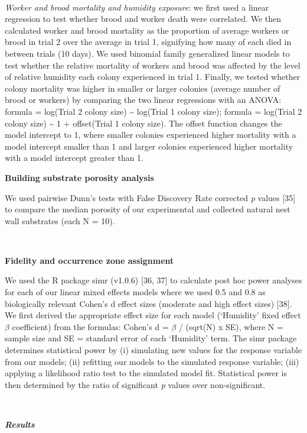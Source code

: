 \documentclass[3p]{elsarticle} %
\begin{document}
~

\emph{Worker and brood mortality and humidity exposure}: we first used a
linear regression to test whether brood and worker death were
correlated. We then calculated worker and brood mortality as the
proportion of average workers or brood in trial 2 over the average in
trial 1, signifying how many of each died in between trials (10 days).
We used binomial family generalized linear models to test whether the
relative mortality of workers and brood was affected by the level of
relative humidity each colony experienced in trial 1. Finally, we tested
whether colony mortality was higher in smaller or larger colonies
(average number of brood or workers) by comparing the two linear
regressions with an ANOVA: formula = log(Trial 2 colony size)
\textasciitilde{} log(Trial 1 colony size); formula = log(Trial 2 colony
size) \textasciitilde{} 1 + offset(Trial 1 colony size). The offset
function changes the model intercept to 1, where smaller colonies
experienced higher mortality with a model intercept smaller than 1 and
larger colonies experienced higher mortality with a model intercept
greater than 1.

\textbf{Building substrate porosity analysis}

We used pairwise Dunn's tests with False Discovery Rate corrected
\emph{p} values {[}35{]} to compare the median porosity of our
experimental and collected natural nest wall substrates (each N = 10).

~

\textbf{Fidelity and occurrence zone assignment}

We used the R package simr (v1.0.6) {[}36, 37{]} to calculate post hoc
power analyses for each of our linear mixed effects models where we used
0.5 and 0.8 as biologically relevant Cohen's d effect sizes (moderate
and high effect sizes) {[}38{]}. We first derived the appropriate effect
size for each model (`Humidity' fixed effect \(\beta\) coefficient) from
the formulas: Cohen's d = \(\beta\) / (sqrt(N) x SE), where N = sample
size and SE = standard error of each `Humidity' term. The simr package
determines statistical power by (i) simulating new values for the
response variable from our models; (ii) refitting our models to the
simulated response variable; (iii) applying a likelihood ratio test to
the simulated model fit. Statistical power is then determined by the
ratio of significant \emph{p} values over non-significant.

~

\textbf{\emph{Results}}
\end{document}
